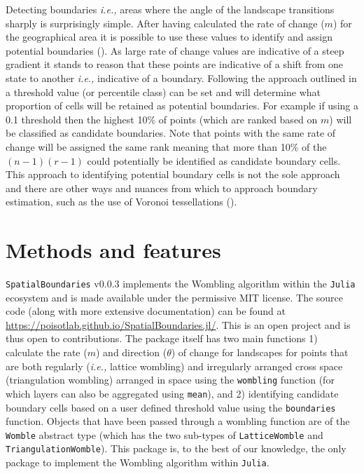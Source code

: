 \begin{refsection}
Detecting boundaries \emph{i.e.,} areas where the angle of the landscape
transitions sharply is surprisingly simple. After having calculated the
rate of change (\(m\)) for the geographical area it is possible to use
these values to identify and assign potential boundaries
(\cite{Fortin2005SpaAna, Oden1993CatWom, Fortin1995DelEco}). As large
rate of change values are indicative of a steep gradient it stands to
reason that these points are indicative of a shift from one state to
another \emph{i.e.,} indicative of a boundary. Following the approach
outlined in \cite{Fortin2005SpaAna} a threshold value (or percentile class)
can be set and will determine what proportion of cells will be retained
as potential boundaries. For example if using a 0.1 threshold then the
highest 10\% of points (which are ranked based on \(m\)) will be
classified as candidate boundaries. Note that points with the same rate
of change will be assigned the same rank meaning that more than 10\% of
the \((n -1)(r - 1)\) could potentially be identified as candidate
boundary cells. This approach to identifying potential boundary cells is
not the sole approach and there are other ways and nuances from which to
approach boundary estimation, such as the use of Voronoi tessellations
(\cite{Fortin1995DelEco, Oden1993CatWom, Matchev2020FinWom}).

\section{Methods and features}\label{methods-and-features}

\texttt{SpatialBoundaries} v0.0.3 implements the Wombling algorithm
within the \texttt{Julia} ecosystem and is made available under the
permissive MIT license. The source code (along with more extensive
documentation) can be found at
\url{https://poisotlab.github.io/SpatialBoundaries.jl/}. This is an open
project and is thus open to contributions. The package itself has two
main functions 1) calculate the rate (\(m\)) and direction (\(\theta\))
of change for landscapes for points that are both regularly (\emph{i.e.,}
lattice wombling) and irregularly arranged cross space (triangulation
wombling) arranged in space using the \texttt{wombling} function (for
which layers can also be aggregated using \texttt{mean}), and 2)
identifying candidate boundary cells based on a user defined threshold
value using the \texttt{boundaries} function. Objects that have been
passed through a wombling function are of the \texttt{Womble} abstract
type (which has the two sub-types of \texttt{LatticeWomble} and
\texttt{TriangulationWomble}). This package is, to the best of our
knowledge, the only package to implement the Wombling algorithm within
\texttt{Julia}.


\end{refsection}

